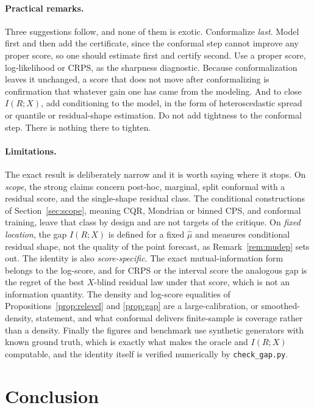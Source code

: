 \documentclass[11pt]{article}
\theoremstyle{definition}
\begin{document}
\paragraph{Practical remarks.} Three suggestions follow, and none of them is exotic.
Conformalize \emph{last}. Model first and then add the certificate, since the conformal step
cannot improve any proper score, so one should estimate first and certify second. Use a
proper score, log-likelihood or CRPS, as the sharpness diagnostic. Because conformalization
leaves it unchanged, a score that does not move after conformalizing is confirmation that
whatever gain one has came from the modeling. And to close $I(R;X)$, add conditioning to the
model, in the form of heteroscedastic spread or quantile or residual-shape estimation. Do
not add tightness to the conformal step. There is nothing there to tighten.

\paragraph{Limitations.} The exact result is deliberately narrow and it is worth saying
where it stops. On \emph{scope}, the strong claims concern post-hoc, marginal, split
conformal with a residual score, and the single-shape residual class. The conditional
constructions of Section~\ref{sec:scope}, meaning CQR, Mondrian or binned CPS, and conformal
training, leave that class by design and are not targets of the critique. On \emph{fixed
location}, the gap $I(R;X)$ is defined for a fixed $\hat\mu$ and measures conditional
residual shape, not the quality of the point forecast, as Remark~\ref{rem:mudep} sets out.
The identity is also \emph{score-specific}. The exact mutual-information form belongs to the
log-score, and for CRPS or the interval score the analogous gap is the regret of the best
$X$-blind residual law under that score, which is not an information quantity. The
density and log-score equalities of Propositions~\ref{prop:relevel} and \ref{prop:gap} are a
large-calibration, or smoothed-density, statement, and what conformal delivers finite-sample
is coverage rather than a density. Finally the figures and benchmark use synthetic
generators with known ground truth, which is exactly what makes the oracle and $I(R;X)$
computable, and the identity itself is verified numerically by \texttt{check\_gap.py}.

\section{Conclusion}
\end{document}

